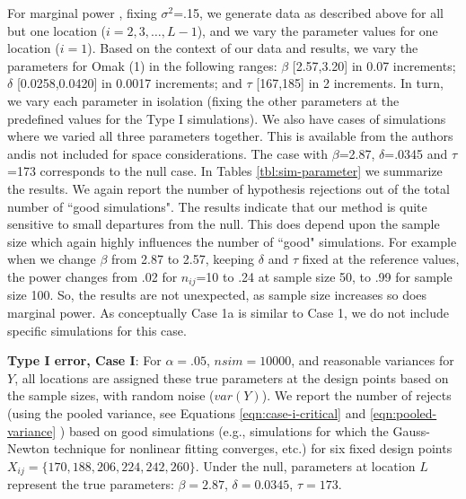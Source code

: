 \documentclass[useAMS]{cJAS2e}
\begin{document}
For marginal power \citep{Spurrier:1992}, fixing $\sigma^2$=.15, we generate data as described above for all but one location ($i = 2, 3, \ldots, L-1$), and we vary the parameter values for one location ($i=1$).  Based on the context of our data and results, we vary the parameters for Omak (1) in the following ranges:  $\beta$ [2.57,3.20] in 0.07 increments; $\delta$ [0.0258,0.0420] in 0.0017 increments; and $\tau$ [167,185] in 2 increments.  In turn, we vary each parameter in isolation (fixing the other parameters at the predefined values for the Type I simulations).  We also have cases of simulations where we varied all three parameters together.  This is available from the authors andis not included for space considerations. The case with $\beta$=2.87, $\delta$=.0345 and $\tau$=173 corresponds to the null case.  In Tables \ref{tbl:sim-parameter} we summarize the results.  We again report the number of hypothesis rejections out of the total number of ``good simulations".  The results indicate that our method is quite sensitive to small departures from the null.  This does depend upon the sample size which again highly influences the number of ``good" simulations.  For example when we change $\beta$ from 2.87 to 2.57, keeping $\delta$ and $\tau$ fixed at the reference values, the power changes from .02 for $n_{ij}$=10 to .24 at sample size 50, to .99 for sample size 100.  So, the results are not unexpected, as sample size increases so does marginal power.   As conceptually Case 1a is similar to Case 1, we do not include specific simulations for this case.

\newpage
\begin{landscape}
	\begin{table}[h!]
	  \begin{center}
	    \scalebox{0.7}{	 }
	  \end{center}
		\caption{\textbf{Type I error, Case I}:  For $\alpha = .05$, $nsim=10000$, and reasonable variances for $Y$, all locations are assigned these true parameters at the design points based on the sample sizes, with random noise ($var(Y)$).  We report the number of rejects (using the pooled variance, see Equations \eqref{eqn:case-i-critical} and \eqref{eqn:pooled-variance} ) based on good simulations (e.g., simulations for which the Gauss-Newton technique for nonlinear fitting converges, etc.) for six fixed design points $X_{ij}=\{170, 188, 206, 224, 242, 260\}$.  Under the null, parameters at location $L$ represent the true parameters:  $\beta = 2.87$, $\delta = 0.0345$, $\tau =  173$.}
		\label{tbl:caseI-typeI-pooled}
	\end{table}
\end{landscape}
\end{document}
